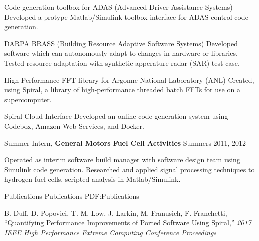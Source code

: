 \documentclass[letterpaper,MMMyyyy,nonstopmode]{simpleresumecv}
\begin{document}
\begin{Body}
\BulletItem
Code generation toolbox for ADAS (Advanced Driver-Assistance Systems)
\SubBulletItem
Developed a protype Matlab/Simulink toolbox interface for ADAS control code generation.

\BulletItem
DARPA BRASS (Building Resource Adaptive Software Systems)
\SubBulletItem
Developed software which can autonomously adapt to changes in hardware or libraries.
\SubBulletItem
Tested resource adaptation with synthetic apperature radar (SAR) test case.

\BulletItem
High Performance FFT library for Argonne National Laboratory (ANL)
\SubBulletItem
Created, using Spiral, a library of high-performance threaded batch FFTs for use on a supercomputer.

\BulletItem
Spiral Cloud Interface
\SubBulletItem
Developed an online code-generation system using Codebox, Amazon Web Services, and Docker.


\BigGap
\Entry
Summer Intern,
\textbf{General Motors Fuel Cell Activities}
\hfill
Summers 2011, 2012

\Gap
\BulletItem
Operated as interim software build manager with software design team using Simulink code generation.
\BulletItem
Researched and applied signal processing techniques to hydrogen fuel cells, scripted analysis in Matlab/Simulink.


%
%
%




\Section
{Publications}
{Publications}
{PDF:Publications}

\begingroup

\Gap
B. Duff, D. Popovici, T. M. Low, J. Larkin, M. Franusich, F. Franchetti,
``Quantifying Performance Improvements of Ported Software Using Spiral,''
\textit{2017 IEEE High Performance Extreme Computing Conference Proceedings}


\end{Body}
\end{document}
